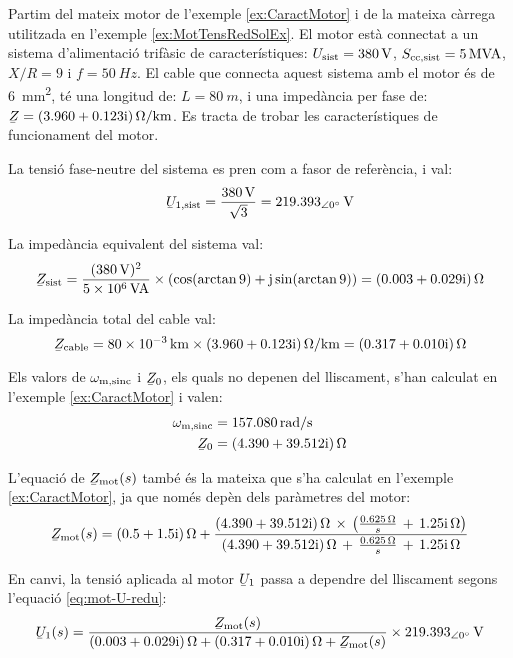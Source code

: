 \begin{exemple}\label{ex:MotTensRedIarr}
	\addcontentsxms{\MotTensRedIarr}
	Partim del mateix motor de l'exemple \vref{ex:CaractMotor} i de la mateixa càrrega utilitzada en l'exemple \vref{ex:MotTensRedSolEx}. El motor està connectat a un sistema d'alimentació trifàsic de característiques: $U_\mathrm{sist}=\qty{380}{V}$, $S_\mathrm{cc,sist}=\qty{5}{MVA}$, $X/R=9$ i $f=\qty{50}{Hz}$. El cable que connecta aquest sistema amb el motor és de \qty{6}{mm^2}, té una longitud de:  $L=\qty{80}{m}$, i una impedància per fase de: $\cmplx{Z} = \complexqty{3,960+j0,123}{\ohm/km}$. Es tracta de trobar les característiques de funcionament del motor.
	
	La tensió fase-neutre del sistema es pren com a fasor de referència, i val:
	\[
		\cmplx{U}\ped{1,sist} = \frac{\qty{380}{V}}{\sqrt{3}} = \qtypd{219,393}{0}{V}
	\]
	
	La impedància equivalent del sistema val:
	\[
		\cmplx{Z}\ped{sist} = \frac{(\qty{380}{V})^2}{\qty{5e6}{VA}} \times (\cos(\arctan 9) + \ju \sin(\arctan 9)) = \complexqty{0,003+j0,029}{\ohm}	
	\]
	
	La impedància total del cable val:
	\[
		\cmplx{Z}\ped{cable} = \qty{80e-3}{km} \times \complexqty{3,960+j0,123}{\ohm/km} = \complexqty{0,317+j0,010}{\ohm}
	\]
	
	Els valors de $\omega_\mathrm{m,sinc}$ i $\cmplx{Z}_0$, els quals no depenen del lliscament, s'han calculat en  l'exemple \ref{ex:CaractMotor} i valen:
	\begin{align*}
		\omega\ped{m,sinc} &=  \qty{157,080}{rad/s} \\
		\cmplx{Z}_0 &=  \complexqty{4,390+j39,512}{\ohm} 
	\end{align*}
		
	L'equació de $\cmplx{Z}\ped{mot}(s)$ també és la mateixa que s'ha calculat en l'exemple  \ref{ex:CaractMotor}, ja que només depèn dels paràmetres del motor:
	\[
		\cmplx{Z}\ped{mot}(s) = \complexqty{0,5+j1,5}{\ohm} + \frac{\complexqty{4,390+j39,512}{\ohm}\,\times\,
		\left(\tfrac{\qty{0,625}{\ohm}}{s}\, + \, \complexqty{j1,25}{\ohm}\right)}{\complexqty{4,390+j39,512}{\ohm}\,+\,
		\tfrac{\qty{0,625}{\ohm}}{s}\, + \,\complexqty{j1,25}{\ohm}}  
	\] 
	
	En canvi, la tensió aplicada al motor $\cmplx{U}_1$ passa a dependre del lliscament segons l'equació \eqref{eq:mot-U-redu}:
	\[
		\cmplx{U}_1(s) = \frac{\cmplx{Z}\ped{mot}(s)}{\complexqty{0,003+j0,029}{\ohm} + \complexqty{0,317+j0,010}{\ohm}  +  \cmplx{Z}\ped{mot}(s)} \times \qtypd{219,393}{0}{V}
	\]
	

\end{exemple}
